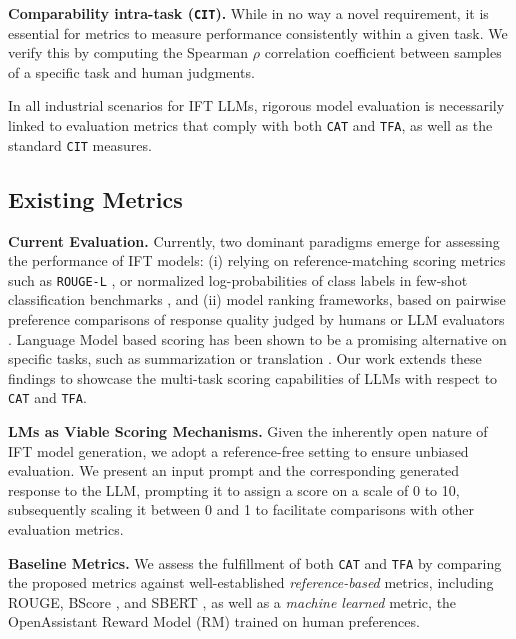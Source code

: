 \noindent\textbf{Comparability intra-task (\texttt{CIT}).} While in no way a novel requirement, it is essential for metrics to measure performance consistently within a given task.  We verify this by computing the Spearman $\rho$ correlation coefficient between samples of a specific task and human judgments.

In all industrial scenarios for IFT LLMs, rigorous model evaluation is necessarily linked to evaluation metrics that comply with both \texttt{CAT} and \texttt{TFA}, as well as the standard \texttt{CIT} measures.

\subsection{Existing Metrics}
\textbf{Current Evaluation.} Currently, two dominant paradigms emerge for assessing the performance of IFT models: (i) relying on reference-matching scoring metrics such as \texttt{ROUGE-L} , or normalized log-probabilities of class labels in few-shot classification benchmarks , and (ii) model ranking frameworks, based on pairwise preference comparisons of response quality judged by humans or LLM evaluators . Language Model based scoring has been shown to be a promising alternative on specific tasks, such as summarization  or translation . Our work extends these findings to showcase the multi-task scoring capabilities of LLMs with respect to \texttt{CAT} and \texttt{TFA}.

\noindent\textbf{LMs as Viable Scoring Mechanisms.} 
Given the inherently open nature of IFT model generation, we adopt a reference-free setting to ensure unbiased evaluation. We present an input prompt and the corresponding generated response to the LLM, prompting it to assign a score on a scale of 0 to 10, subsequently scaling it between 0 and 1 to facilitate comparisons with other evaluation metrics. %

\noindent \textbf{Baseline Metrics.}  We assess the fulfillment of both \texttt{CAT} and \texttt{TFA} by comparing the proposed metrics against well-established \textit{reference-based} metrics, including ROUGE, BScore , and SBERT , as well as a \textit{machine learned} metric, the OpenAssistant Reward Model (RM)  trained on human preferences. 

